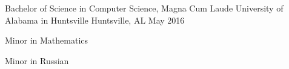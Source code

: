 
\begin{cventries}
  \cventry
    {Bachelor of Science in Computer Science, Magna Cum Laude} %
    {University of Alabama in Huntsville} %
    {Huntsville, AL} %
    {May 2016} %
    {
       \begin{cvitems} %
         \item {Minor in Mathematics}
         \item {Minor in Russian}
       \end{cvitems}
    }

\end{cventries}
